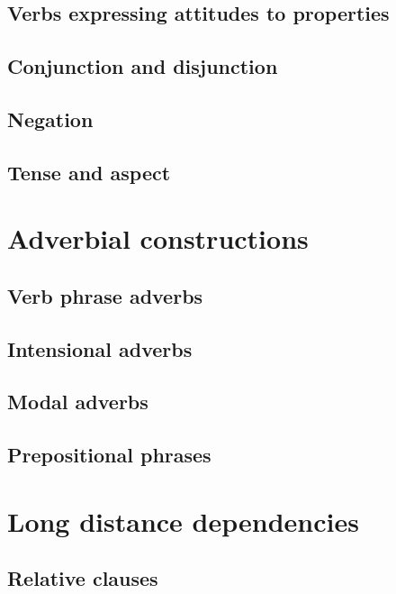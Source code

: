 \subsection{Verbs expressing attitudes to properties}

\subsection{Conjunction and disjunction}

\subsection{Negation}

\subsection{Tense and aspect}

\section{Adverbial constructions}

\subsection{Verb phrase adverbs}

\subsection{Intensional adverbs}

\subsection{Modal adverbs}

\subsection{Prepositional phrases}

\newpage

\section{Long distance dependencies}

\subsection{Relative clauses}


